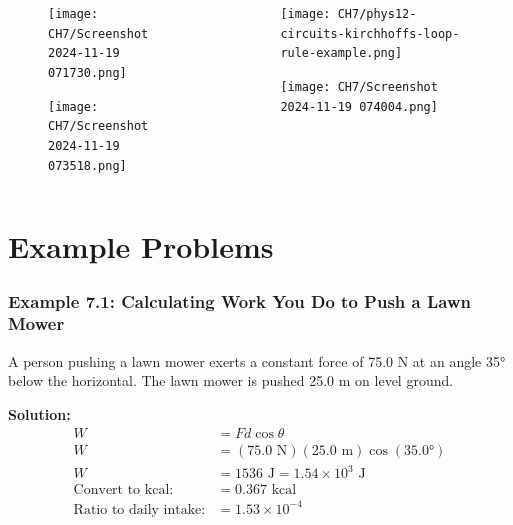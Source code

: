 \documentclass{beamer}
\begin{document}
\begin{frame}
\begin{columns}[T]
    \begin{column}{0.5\textwidth}
        \begin{figure}
            \centering
            \texttt{[image: CH7/Screenshot 2024-11-19 071730.png]}
        \end{figure}
        \begin{figure}
            \centering
            \texttt{[image: CH7/Screenshot 2024-11-19 073518.png]}
        \end{figure}
    \end{column}
    
    \begin{column}{0.5\textwidth}
        \begin{figure}
            \centering
            \texttt{[image: CH7/phys12-circuits-kirchhoffs-loop-rule-example.png]}
        \end{figure}
        \begin{figure}
            \centering
            \texttt{[image: CH7/Screenshot 2024-11-19 074004.png]}
        \end{figure}
    \end{column}
\end{columns}
\end{frame}

\section{Example Problems}

\begin{frame}
\frametitle{Example 7.1: Calculating Work You Do to Push a Lawn Mower}
A person pushing a lawn mower exerts a constant force of 75.0 N at an angle 35° below the horizontal. The lawn mower is pushed 25.0 m on level ground.
\vspace{0.5cm}
\end{frame}

\begin{frame}
\textbf{Solution:}
\begin{align*}
W &= Fd\cos\theta \\
W &= (75.0\text{ N})(25.0\text{ m})\cos(35.0°) \\
W &= 1536\text{ J} = 1.54 \times 10^3\text{ J} \\
\text{Convert to kcal:} &= 0.367\text{ kcal} \\
\text{Ratio to daily intake:} &= 1.53 \times 10^{-4}
\end{align*}
\end{frame}
\end{document}
